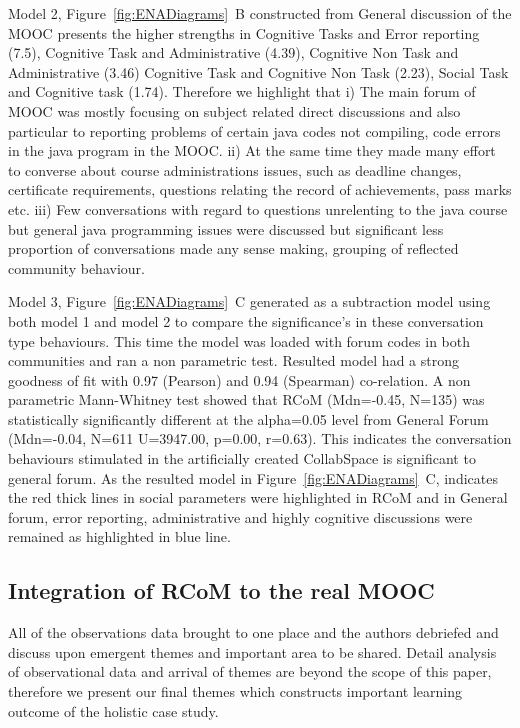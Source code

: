 \documentclass[format=acmsmall, review=false, screen=true]{acmart}
\begin{document}
Model 2, Figure~\ref{fig:ENADiagrams}~B constructed from General discussion of the MOOC presents the higher strengths in Cognitive Tasks and Error reporting (7.5), Cognitive Task and Administrative (4.39), Cognitive Non Task and Administrative (3.46) Cognitive Task and Cognitive Non Task (2.23), Social Task and Cognitive task (1.74). Therefore we highlight that i) The main forum of MOOC was mostly focusing on subject related direct discussions and also particular to reporting problems of certain java codes not compiling, code errors in the java program in the MOOC. ii) At the same time they made many effort to converse about course administrations issues, such as deadline changes, certificate requirements, questions relating the record of achievements, pass marks etc. iii) Few conversations with regard to questions unrelenting to the java course but general java programming issues were discussed but significant less proportion of conversations made any sense making, grouping of reflected community behaviour. 

Model 3, Figure~\ref{fig:ENADiagrams}~C generated as a subtraction model using both model 1 and model 2 to compare the significance's in these conversation type behaviours. This time the model was loaded with forum codes in both communities and ran a non parametric test. Resulted model had a strong goodness of fit with 0.97 (Pearson) and 0.94 (Spearman) co-relation. A non parametric Mann-Whitney test showed that RCoM (Mdn=-0.45, N=135) was statistically significantly different at the alpha=0.05 level from General Forum (Mdn=-0.04, N=611 U=3947.00, p=0.00, r=0.63). This indicates the conversation behaviours stimulated in the artificially created CollabSpace is significant to general forum. As the resulted model in Figure~\ref{fig:ENADiagrams}~C, indicates the red thick lines in social parameters were highlighted in RCoM and in General forum, error reporting, administrative and highly cognitive discussions were remained as highlighted in blue line.

\subsection{Integration of RCoM to the real MOOC}

All of the observations data brought to one place and the authors debriefed and discuss upon emergent themes and important area to be shared. Detail analysis of observational data and arrival of themes are beyond the scope of this paper, therefore we present our final themes which constructs important learning outcome of the holistic case study. 
\end{document}

